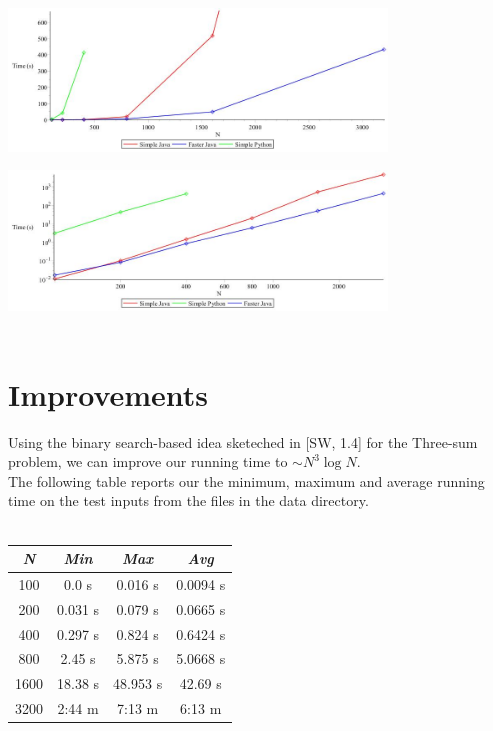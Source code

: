 \documentclass[a4paper,11pt]{article}
\begin{document}
\hspace{5mm}\\
\hspace{5mm}\\

\includegraphics[width=380px]{simple-plot}

\includegraphics[width=380px]{simple-plot-log}\\
\hspace{5mm}\\

\section*{Improvements}
Using the binary search-based idea sketeched in [SW, 1.4] for the
Three-sum problem, we can improve our running time to $\sim N^3 \log N $. \\
The following table reports our the minimum, maximum and average running time
on the test inputs from the files in the data directory. \\
\hspace{5mm}\\

\centering
{
\begin{tabular}{cccc}
\hline
\textit{N} & \textit{Min} & \textit{Max} & \textit{Avg} \\
\hline
100 & 0.0 s & 0.016 s & 0.0094 s \\
200 & 0.031 s & 0.079 s & 0.0665 s \\
400 & 0.297 s & 0.824 s & 0.6424 s \\
800 & 2.45 s & 5.875 s & 5.0668 s \\
1600 & 18.38 s & 48.953 s & 42.69 s \\
3200 & 2:44 m & 7:13 m & 6:13 m \\
\hline
\end{tabular}
}
\end{document}
